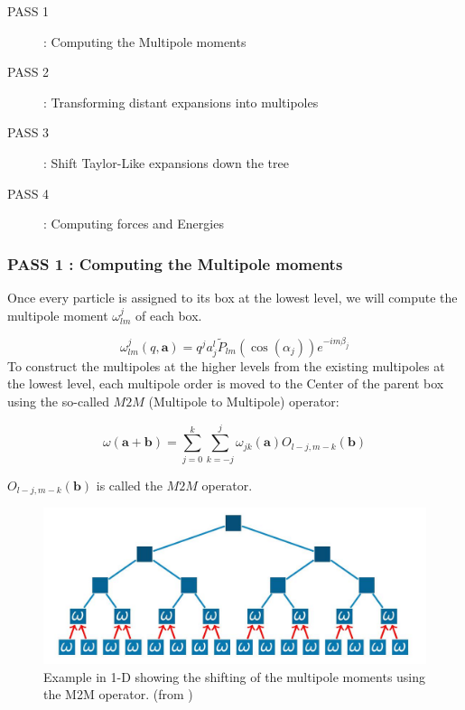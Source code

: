 \documentclass[11pt,twoside,a4paper]{report}
\begin{document}
	\begin{description}
	\item[PASS 1] : Computing the Multipole moments
	\item[PASS 2] : Transforming distant expansions into multipoles
	\item[PASS 3] : Shift Taylor-Like expansions down the tree
	\item[PASS 4] : Computing forces and Energies
	
	\end{description}
		
	
	    
    
    
    \subsubsection{PASS 1 : Computing the Multipole moments}
    
    Once every particle is assigned to its box at the lowest level, we will compute the multipole moment $\omega_{lm}^j$ of each box.
    
    \begin{equation}
    \omega_{lm}^{j}(q,\textbf{a}) = q^j a_j^l \widetilde{P}_{lm}(\cos(\alpha_j))e^{-im\beta_j}
    \end{equation}
%
To construct the multipoles at the higher levels from the existing multipoles at the lowest level, each multipole order is moved to the Center of the parent box using the so-called $M2M$ (Multipole to Multipole) operator:    
    
    \begin{equation}
    \omega(\textbf{a} + \textbf{b}) = \sum\limits_{j=0}^{k} \sum\limits_{k=-j}^{j} \omega_{jk}(\textbf{a}) O_{l-j,m-k}(\textbf{b})
    \end{equation}

   $O_{l-j,m-k}(\textbf{b})$ is called the $M2M$ operator.
   
   \begin{figure}[H]
   \includegraphics[scale=0.4]{ShiftMultipole}
    \centering 
    \caption{Example in 1-D showing the shifting of the multipole moments using the M2M operator. (from \cite{phdIvo}) }
    \label{fig:multipole}
   \end{figure}
   
\end{document}

